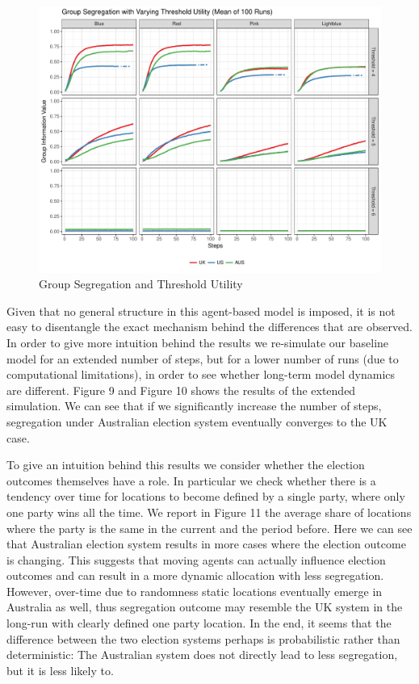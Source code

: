 \documentclass[12pt, a4paper]{article}
\begin{document}
	\begin{figure}[bp!]
		\centering
		\caption{Group Segregation and Threshold Utility}
		\includegraphics[scale=0.6]{./Plots/th_grp_ratios.pdf}
	\end{figure}
	
	Given that no general structure in this agent-based model is imposed, it is not easy to disentangle the exact mechanism behind the differences that are observed. In order to give more intuition behind the results we re-simulate our baseline model for an extended number of steps, but for a lower number of runs (due to computational limitations), in order to see whether long-term model dynamics are different. Figure 9 and Figure 10 shows the results of the extended simulation. We can see that if we significantly increase the number of steps, segregation under Australian election system eventually converges to the UK case. 
	
	To give an intuition behind this results we consider whether the election outcomes themselves have a role. In particular we check whether there is a tendency over time for locations to become defined by a single party, where only one party wins all the time. We report in Figure 11 the average share of locations where the party is the same in the current and the period before. Here we can see that Australian election system results in more cases where the election outcome is changing. This suggests that moving agents can actually influence election outcomes and can result in a more dynamic allocation with less segregation. However, over-time due to randomness static locations eventually emerge in Australia as well, thus segregation outcome may resemble the UK system in the long-run with clearly defined one party location. In the end, it seems that the difference between the two election systems perhaps is probabilistic rather than deterministic: The Australian system does not directly lead to less segregation, but it is less likely to. 
	
\end{document}
